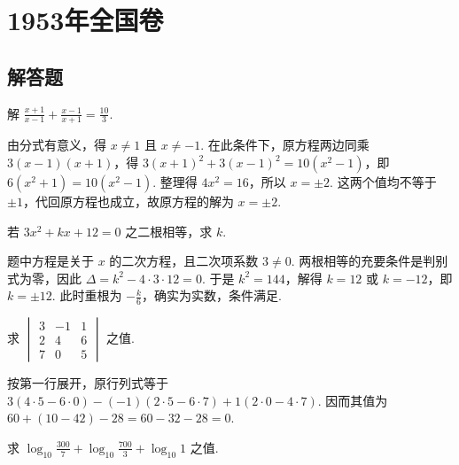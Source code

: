 \chapter{1953年全国卷}

\section{解答题}

\begin{problem}
解 \(\frac{x + 1}{x - 1} + \frac{x - 1}{x + 1} = \frac{10}{3}\).
\end{problem}

\begin{solution}
由分式有意义，得 \(x\ne1\) 且 \(x\ne-1\). 在此条件下，原方程两边同乘 \(3\left(x-1\right)\left(x+1\right)\)，得 \(3\left(x+1\right)^2+3\left(x-1\right)^2=10\left(x^2-1\right)\)，即 \(6\left(x^2+1\right)=10\left(x^2-1\right)\). 整理得 \(4x^2=16\)，所以 \(x=\pm2\). 这两个值均不等于 \(\pm1\)，代回原方程也成立，故原方程的解为 \(x=\pm2\).
\end{solution}

\begin{problem}
若 \(3x^{2} + kx + 12 = 0\) 之二根相等，求 \(k\).
\end{problem}

\begin{solution}
题中方程是关于 \(x\) 的二次方程，且二次项系数 \(3\ne0\). 两根相等的充要条件是判别式为零，因此 \(\Delta=k^2-4\cdot3\cdot12=0\). 于是 \(k^2=144\)，解得 \(k=12\) 或 \(k=-12\)，即 \(k=\pm12\). 此时重根为 \(-\frac{k}{6}\)，确实为实数，条件满足.
\end{solution}

\begin{problem}
求 \(\begin{vmatrix}3 & -1 & 1\\ 2 & 4 & 6\\ 7 & 0 & 5 \end{vmatrix}\) 之值.
\end{problem}

\begin{solution}
按第一行展开，原行列式等于 \(3\left(4\cdot5-6\cdot0\right)-\left(-1\right)\left(2\cdot5-6\cdot7\right)+1\left(2\cdot0-4\cdot7\right)\). 因而其值为 \(60+\left(10-42\right)-28=60-32-28=0\).
\end{solution}

\begin{problem}
求 \(\log_{10}\frac{300}{7} + \log_{10}\frac{700}{3} + \log_{10}1\) 之值.
\end{problem}

